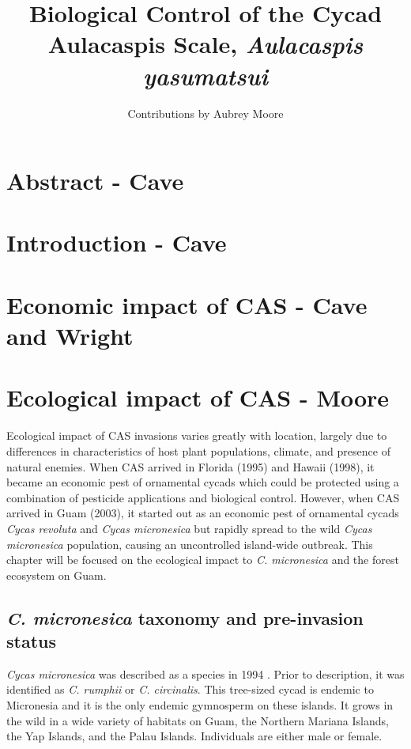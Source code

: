 \documentclass[12pt,letterpaper,english,bibliography=totocnumbered, abstract=on]{scrartcl}
\begin{document}
	
\listoftodos



\title{Biological Control of the Cycad Aulacaspis Scale, \textit{Aulacaspis yasumatsui}}

\author{Contributions by Aubrey Moore}

\maketitle
\newpage
\tableofcontents

\pagebreak

\section{Abstract - Cave}

\section{Introduction - Cave}

\section{Economic impact of CAS - Cave and Wright}

\section{Ecological impact of CAS - Moore}

Ecological impact of CAS invasions varies greatly with location, largely due to differences in characteristics of host plant populations, climate, and presence of natural enemies. When CAS arrived in Florida (1995) and Hawaii (1998), it became an economic pest of ornamental cycads which could be protected using a combination of pesticide applications and biological control. However, when CAS arrived in Guam (2003), it started out as an economic pest of ornamental cycads \textit{Cycas revoluta} and \textit{Cycas micronesica} but rapidly spread to the wild \textit{Cycas micronesica} population, causing an uncontrolled island-wide outbreak. This chapter will be focused on the ecological impact to \textit{C. micronesica} and the forest ecosystem on Guam.

\subsection{\textit{C. micronesica} taxonomy and pre-invasion status} \textit{Cycas micronesica} was described as a species in 1994 \parencite{hillCycasRumphiiComplex1994}.
Prior to description, it was identified as \textit{C. rumphii} or \textit{C. circinalis}. 
This tree-sized cycad is endemic to Micronesia and it is the only endemic gymnosperm on these islands. It grows in the wild in a wide variety of habitats on Guam, the Northern Mariana Islands, the Yap Islands, and the Palau Islands. Individuals are either male or female.
\end{document}
